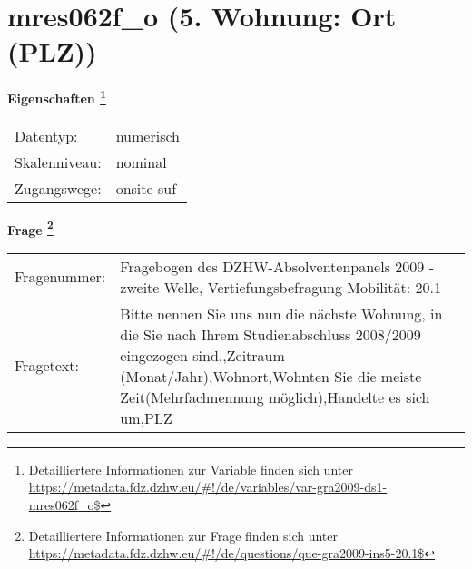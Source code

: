
    \setcounter{footnote}{0}

    \vspace*{-1.8cm}
	\section{mres062f\_o (5. Wohnung: Ort (PLZ))}
	\label{section:mres062f_o}



    \vspace*{0.5cm}
    \noindent\textbf{Eigenschaften
	\footnote{Detailliertere Informationen zur Variable finden sich unter
		\url{https://metadata.fdz.dzhw.eu/\#!/de/variables/var-gra2009-ds1-mres062f_o$}}}\\
	\begin{tabularx}{\hsize}{@{}lX}
	Datentyp: & numerisch \\
	Skalenniveau: & nominal \\
	Zugangswege: &
	  onsite-suf
 \\
    \end{tabularx}



				\vspace*{0.5cm}
                \noindent\textbf{Frage
	                \footnote{Detailliertere Informationen zur Frage finden sich unter
		              \url{https://metadata.fdz.dzhw.eu/\#!/de/questions/que-gra2009-ins5-20.1$}}}\\
				\begin{tabularx}{\hsize}{@{}lX}
					Fragenummer: &
					  Fragebogen des DZHW-Absolventenpanels 2009 - zweite Welle, Vertiefungsbefragung Mobilität:
					  20.1
 \\
					Fragetext: & Bitte nennen Sie uns nun die nächste Wohnung, in die Sie nach Ihrem Studienabschluss 2008/2009 eingezogen sind.,Zeitraum (Monat/Jahr),Wohnort,Wohnten Sie die meiste Zeit(Mehrfachnennung möglich),Handelte es sich um,PLZ \\
				\end{tabularx}





